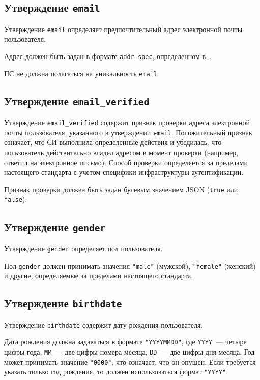 \subsection{Утверждение \lstinline{email}}\label{CLAIMS.Email}

Утверждение \lstinline{email} определяет предпочтительный адрес электронной 
почты пользователя.

Адрес должен быть задан в формате \lstinline{addr-spec}, определенном 
в~\cite{RFC5322}.

ПС не должна полагаться на уникальность \lstinline{email}.

\subsection{Утверждение \lstinline{email_verified}}\label{CLAIMS.EmailVerified}

Утверждение \lstinline{email_verified} содержит признак проверки адреса
электронной почты пользователя, указанного в утверждении \lstinline{email}.
%
Положительный признак означает, что СИ выполнила определенные действия и
убедилась, что пользователь действительно владел адресом в момент проверки
(например, ответил на электронное письмо).
%
Способ проверки определяется за пределами настоящего стандарта с учетом 
специфики инфраструктуры аутентификации.  

Признак проверки должен быть задан булевым значением JSON
(\lstinline{true} или \lstinline{false}).

\subsection{Утверждение \lstinline{gender}}\label{CLAIMS.Gender}

Утверждение \lstinline{gender} определяет пол пользователя. 

Пол \lstinline{gender} должен принимать значения 
\lstinline{"male"} (мужской), \lstinline{"female"} (женский)
и другие, определяемые за пределами настоящего стандарта.

\subsection{Утверждение \lstinline{birthdate}}\label{CLAIMS.Birthdate}

Утверждение \lstinline{birthdate} содержит дату рождения пользователя. 

Дата рождения должна задаваться в формате \lstinline{"YYYYMMDD"},
где \lstinline{YYYY}~--- четыре цифры года, \lstinline{MM}~--- две цифры номера 
месяца, \lstinline{DD}~--- две цифры дня месяца.
%
Год может принимать значение \lstinline{"0000"}, что означает, что он опущен. 
%
Если требуется указать только год рождения, то должен использоваться формат 
\lstinline{"YYYY"}. 

